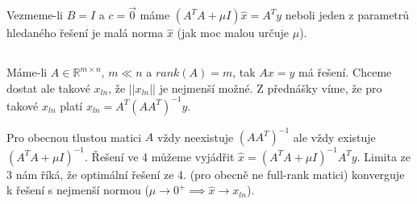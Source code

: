 \documentclass[12pt, a4paper]{article}
\begin{document}
Vezmeme-li $B=I$ a $c=\vec{0}$ máme $(A^TA+\mu I)\hat{x}= A^Ty$ neboli jeden z parametrů hledaného řešení je malá norma $\hat{x}$ (jak moc malou určuje $\mu$).

\subsection{}
Máme-li $A \in \mathbb{R}^{m \times n}$, $m \ll n$ a $rank(A)=m$, tak $Ax=y$ má řešení. Chceme dostat ale takové $x_{ln}$, že $||x_{ln}||$ je nejmenší možné. Z přednášky víme, že pro takové $x_{ln}$ platí $x_{ln}=A^T(AA^T)^{-1}y $.

Pro obecnou tlustou matici $A$ vždy neexistuje $(AA^T)^{-1}$ ale vždy existuje $(A^T A+ \mu I)^{-1}$. Řešení ve 4 můžeme vyjádřit $\hat{x} = (A^TA+\mu I)^{-1} A^Ty$. Limita ze 3 nám říká, že optimální řešení ze 4. (pro obecně ne full-rank matici) konverguje k řešení s nejmenší normou ($\mu \rightarrow 0^+ \implies \hat{x} \rightarrow x_{ln}$).
\end{document}
